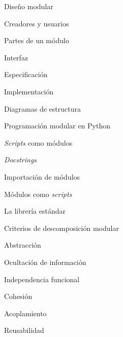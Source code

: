 \begin{longenum}
\begin{longenum}
\begin{longenum}
        \end{longenum}
        \item Diseño modular
        \begin{longenum}
            \item Creadores y usuarios
            \item Partes de un módulo
            \begin{longenum}
                \item Interfaz
                \begin{longenum}
                    \item Especificación
                \end{longenum}
                \item Implementación
            \end{longenum}
            \item Diagramas de estructura
        \end{longenum}
        \item Programación modular en Python
        \begin{longenum}
            \item \textit{Scripts} como módulos
            \begin{longenum}
                \item \textit{Docstrings}
            \end{longenum}
            \item Importación de módulos
            \item Módulos como \textit{scripts}
            \item La librería estándar
        \end{longenum}
        \item Criterios de descomposición modular
        \begin{longenum}
            \item Abstracción
            \item Ocultación de información
            \item Independencia funcional
            \begin{longenum}
                \item Cohesión
                \item Acoplamiento
            \end{longenum}
            \item Reusabilidad
        \end{longenum}
    \end{longenum}

\end{longenum}
